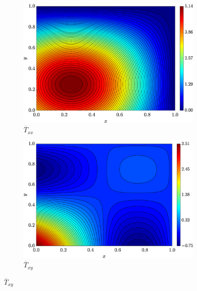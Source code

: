 \documentclass[preprint, 12pt]{elsarticle}
\begin{document}
\begin{figure}[H]
    \centering
    \begin{subfigure}[b]{.46\textwidth}
        \includegraphics[width=\textwidth]{Exact_Map_NormErr_2nd_Betann_0.1_Re_1_Wi_1_epsilon_0_xi_0_alphaG_0_Dt_1e-06_at_0.05_tipsim_1_MMS_12_Txx.eps}
        \caption{$\overline{T}_{xx}$}
        \label{fig_solexatxxstreamlineCase1}
    \end{subfigure}
    \vspace{0.2cm}
    \begin{subfigure}[b]{.46\textwidth}
        \includegraphics[width=\textwidth]{Exact_Map_NormErr_2nd_Betann_0.1_Re_1_Wi_1_epsilon_0_xi_0_alphaG_0_Dt_1e-06_at_0.05_tipsim_1_MMS_12_Txy.eps}
        \caption{$\overline{T}_{xy}$}
        \label{fig_solexatxystreamlineCase1}
    \end{subfigure}

\end{figure}
\end{document}
